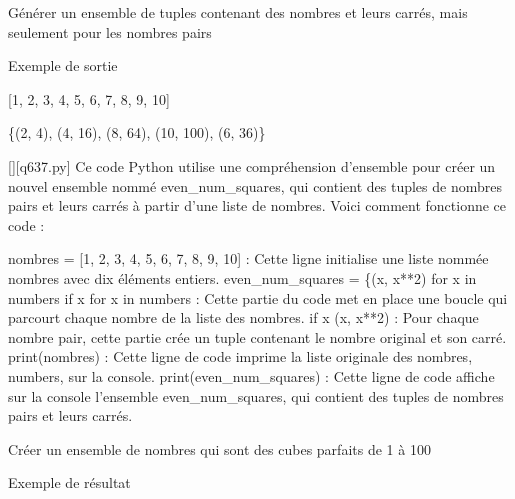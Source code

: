         \question
        Générer un ensemble de tuples contenant des nombres et leurs carrés, mais seulement pour les nombres pairs

Exemple de sortie

[1, 2, 3, 4, 5, 6, 7, 8, 9, 10]

\{(2, 4), (4, 16), (8, 64), (10, 100), (6, 36)\}
        \par
        \begin{solution}
            \renewcommand{\nomfichier}{q637.py}
            \pythonfile{\chemincode \nomfichier}[][\nomfichier]
            Ce code Python utilise une compréhension d'ensemble pour créer un nouvel ensemble nommé even\_num\_squares, qui contient des tuples de nombres pairs et leurs carrés à partir d'une liste de nombres. Voici comment fonctionne ce code :

    nombres = [1, 2, 3, 4, 5, 6, 7, 8, 9, 10] : Cette ligne initialise une liste nommée nombres avec dix éléments entiers.
    even\_num\_squares = \{(x, x**2) for x in numbers if x %
        for x in numbers : Cette partie du code met en place une boucle qui parcourt chaque nombre de la liste des nombres.
        if x %
        (x, x**2) : Pour chaque nombre pair, cette partie crée un tuple contenant le nombre original et son carré.
    print(nombres) : Cette ligne de code imprime la liste originale des nombres, numbers, sur la console.
    print(even\_num\_squares) : Cette ligne de code affiche sur la console l'ensemble even\_num\_squares, qui contient des tuples de nombres pairs et leurs carrés.
        \end{solution}
        

        \question
        Créer un ensemble de nombres qui sont des cubes parfaits de 1 à 100

Exemple de résultat

